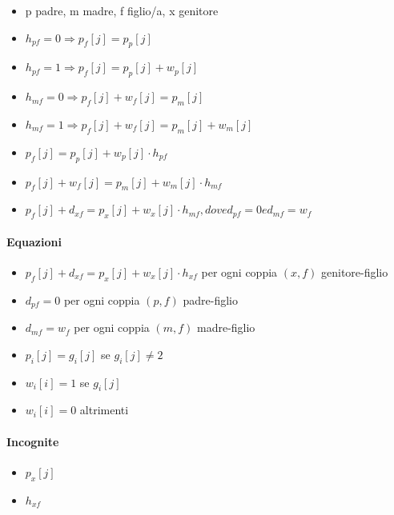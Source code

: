 \begin{itemize}
    \item p padre, m madre, f figlio/a, x genitore
    \item $h_{pf} = 0 \Rightarrow p_f[j] = p_p[j]$
    \item $h_{pf} = 1 \Rightarrow p_f[j] = p_p[j] + w_p[j]$
    \item $h_{mf} = 0 \Rightarrow p_f[j] + w_f[j] = p_m[j]$
    \item $h_{mf} = 1 \Rightarrow p_f[j] + w_f[j] = p_m[j] + w_m[j]$
    \item $p_f[j] = p_p[j] + w_p[j] \cdot h_{pf}$
    \item $p_f[j] + w_f[j] = p_m[j] + w_m[j] \cdot h_{mf}$
    \item $p_f[j] + d_{xf} = p_x[j] + w_x[j] \cdot h_{mf}, dove d_{pf} = 0 e d_{mf} = w_f$
\end{itemize}

\paragraph{Equazioni}

\begin{itemize}
    \item $p_f[j] + d_{xf} = p_x[j] + w_x[j] \cdot h_{xf}$ per ogni coppia $(x,f)$ genitore-figlio
    \item $d_{pf} = 0$ per ogni coppia $(p,f)$ padre-figlio
    \item $d_{mf} = w_f$ per ogni coppia $(m,f)$ madre-figlio
    \item $p_i[j] = g_i[j]$ se $g_i[j] \ne 2$
    \item $w_i[i] = 1$ se $g_i[j]$
    \item $w_i[i] = 0$ altrimenti
\end{itemize}

\paragraph{Incognite}

\begin{itemize}
    \item $p_x[j]$
    \item $h_{xf}$
\end{itemize}
